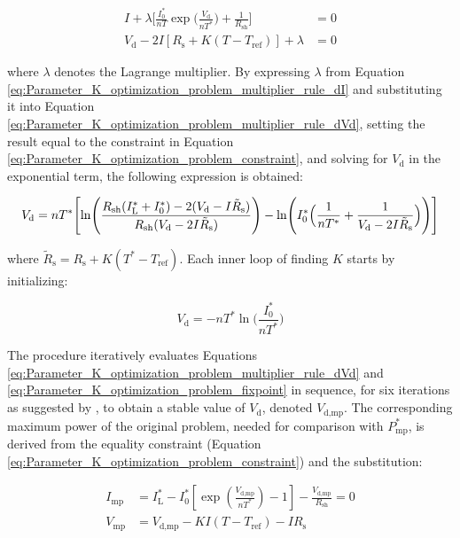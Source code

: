 \begin{align}
    I + \lambda \Biggl[ \frac{I_{0}^*}{nT} \exp \Biggl( \frac{V_{\text{d}}}{nT^*}\Biggr) + \frac{1}{R_{\text{sh}}}\Biggr] &= 0
    \label{eq:Parameter_K_optimization_problem_multiplier_rule_dVd} \\
    V_{\text{d}} - 2I[R_{\text{s}} + K(T-T_{\text{ref}})] + \lambda &= 0 
    \label{eq:Parameter_K_optimization_problem_multiplier_rule_dI}
\end{align}

\noindent
where \(\lambda\) denotes the Lagrange multiplier.
By expressing \(\lambda\) from Equation \ref{eq:Parameter_K_optimization_problem_multiplier_rule_dI}
and substituting it into Equation \ref{eq:Parameter_K_optimization_problem_multiplier_rule_dVd},
setting the result equal to the constraint in Equation \ref{eq:Parameter_K_optimization_problem_constraint},
and solving for \(V_{\text{d}}\) in the exponential term, the following expression is obtained:

\begin{equation}
    V_{\text{d}} = nT^* \Biggl[ \ln \Biggl( \frac{R_{\text{sh}}(I_{\text{L}}^* + I_{0}^*) - 2(V_{\text{d}} - I\tilde{R}_{\text{s}})}{R_{\text{sh}}(V_{\text{d}} - 2I\tilde{R}_{\text{s}})} \Biggr)- \ln \Biggl( I_{0}^* \Bigl( \frac{1}{nT^*} + \frac{1}{V_{\text{d}} - 2I\tilde{R}_{\text{s}}} \Bigr) \Biggr)\Biggr]
    \label{eq:Parameter_K_optimization_problem_fixpoint}
\end{equation}

\noindent
where \(\tilde{R}_{\text{s}} = R_{\text{s}} + K(T^* - T_{\text{ref}})\). Each inner loop of
finding \(K\) starts by initializing:

\begin{equation}
    V_{\text{d}} = -nT^* \ln\biggl( \frac{I_{0}^*}{nT^*} \biggr)
\end{equation}

\noindent
The procedure iteratively evaluates Equations \ref{eq:Parameter_K_optimization_problem_multiplier_rule_dVd}
and \ref{eq:Parameter_K_optimization_problem_fixpoint} in sequence, for six iterations as
suggested by \cite{Orioli}, to obtain a stable value of \(V_{\text{d}}\), denoted \(V_{\text{d,mp}}\). The
corresponding maximum power of the original problem, needed for comparison with
\(P_{\text{mp}}^{*}\), is derived from the equality constraint
(Equation \ref{eq:Parameter_K_optimization_problem_constraint}) and the substitution:

\begin{align}
    I_{\text{mp}} &= I_{\text{L}}^* - I_{0}^* \left[\exp\left(\frac{V_{\text{d,mp}}}{nT^*}\right) - 1\right] - \frac{V_{\text{d,mp}}}{R_{\text{sh}}} = 0 \\
    V_{\text{mp}} &= V_{\text{d,mp}} - KI(T-T_{\text{ref}}) - IR_{\text{s}}
\end{align}

